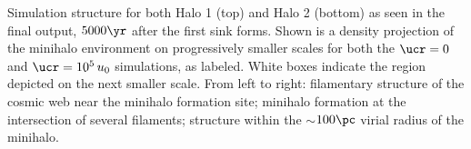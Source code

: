 \label{fig:structure}
Simulation structure for both Halo 1 (top) and Halo 2 (bottom) as seen in the final output, $5000\yr$ after the first sink forms.  Shown is a density projection of the minihalo environment on progressively smaller scales for both the $\ucr=0$ and $\ucr=10^5\,u_0$ simulations, as labeled.  White boxes indicate the region depicted on the next smaller scale.  From left to right: filamentary structure of the cosmic web near the minihalo formation site; minihalo formation at the intersection of several filaments; structure within the $\sim$$100\pc$ virial radius of the minihalo.